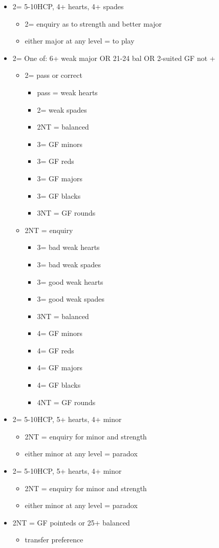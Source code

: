 \documentclass[a4paper,14pt]{extarticle}
\begin{document}
\begin{itemize}
\item 2\clubs = 5-10HCP, 4+ hearts, 4+ spades
	\begin{itemize}
	\item 2\diamonds = enquiry as to strength and better major
	\item either major at any level = to play
	\end{itemize}
\item 2\diamonds = One of: 6+ weak major OR 21-24 bal OR 2-suited GF not \spades+\diamonds
	\begin{itemize}
	\item 2\hearts = pass or correct
		\begin{itemize}
		\item pass = weak hearts
		\item 2\spades = weak spades
		\item 2NT = balanced
		\item 3\clubs = GF minors
		\item 3\diamonds = GF reds
		\item 3\hearts = GF majors
		\item 3\spades = GF blacks
		\item 3NT = GF rounds
		\end{itemize}
	\item 2NT = enquiry
		\begin{itemize}
		\item 3\clubs = bad weak hearts
		\item 3\diamonds = bad weak spades
		\item 3\hearts = good weak hearts
		\item 3\spades = good weak spades
		\item 3NT = balanced
		\item 4\clubs = GF minors
		\item 4\diamonds = GF reds
		\item 4\hearts = GF majors
		\item 4\spades = GF blacks
		\item 4NT = GF rounds
		\end{itemize}
	\end{itemize}
\item 2\hearts = 5-10HCP, 5+ hearts, 4+ minor
	\begin{itemize}
	\item 2NT = enquiry for minor and strength
	\item either minor at any level = paradox 
	\end{itemize}
\item 2\spades = 5-10HCP, 5+ hearts, 4+ minor
	\begin{itemize}
	\item 2NT = enquiry for minor and strength
	\item either minor at any level = paradox 
	\end{itemize}
\item 2NT = GF pointeds or 25+ balanced
	\begin{itemize}
	\item transfer preference
	\end{itemize}
\end{itemize}
\end{document}
